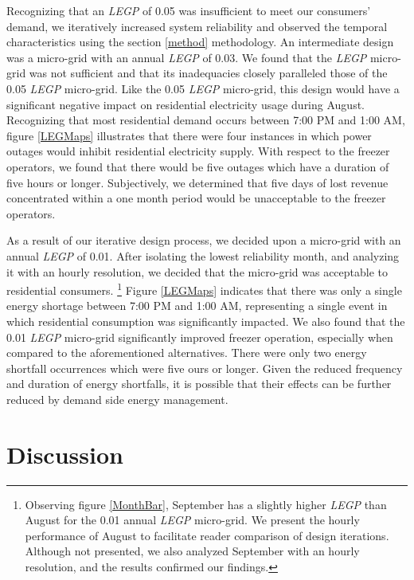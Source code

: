 \documentclass{article}
\begin{document}
Recognizing that an \emph{LEGP} of 0.05 was insufficient to meet our consumers' demand, we iteratively increased system reliability and observed the temporal characteristics using the section \ref{method} methodology.
An intermediate design was a micro-grid with an annual \emph{LEGP} of 0.03. 
We found that the \emph{LEGP} micro-grid was not sufficient and that its inadequacies closely paralleled those of the 0.05 \emph{LEGP} micro-grid.
Like the 0.05 \emph{LEGP} micro-grid, this design would have a significant negative impact on residential electricity usage during August.
Recognizing that most residential demand occurs between 7:00 PM and 1:00 AM, figure \ref{LEGMaps} illustrates that there were four instances in which power outages would inhibit residential electricity supply. 
With respect to the freezer operators, we found that there would be five outages which have a duration of five hours or longer. 
Subjectively, we determined that five days of lost revenue concentrated within a one month period would be unacceptable to the freezer operators. 

As a result of our iterative design process, we decided upon a micro-grid with an annual \emph{LEGP} of 0.01. After isolating the lowest reliability month, and analyzing it with an hourly resolution, we decided that the micro-grid was acceptable to residential consumers. 
%
%
\footnote{Observing figure \ref{MonthBar}, September has a slightly higher \emph{LEGP} than August for the 0.01 annual \emph{LEGP} micro-grid. 
We present the hourly performance of August to facilitate reader comparison of design iterations. 
Although not presented, we also analyzed September with an hourly resolution, and the results confirmed our findings.}
%
%
%
Figure \ref{LEGMaps} indicates that there was only a single energy shortage between 7:00 PM and 1:00 AM, representing a single event in which residential consumption was significantly impacted.
We also found that the 0.01 \emph{LEGP} micro-grid significantly improved freezer operation, especially when compared to the aforementioned alternatives. There were only two energy shortfall occurrences which were five ours or longer. 
Given the reduced frequency and duration of energy shortfalls, it is possible that their effects can be further reduced by demand side energy management.

\section{Discussion} \label{Discussion}
\end{document}
